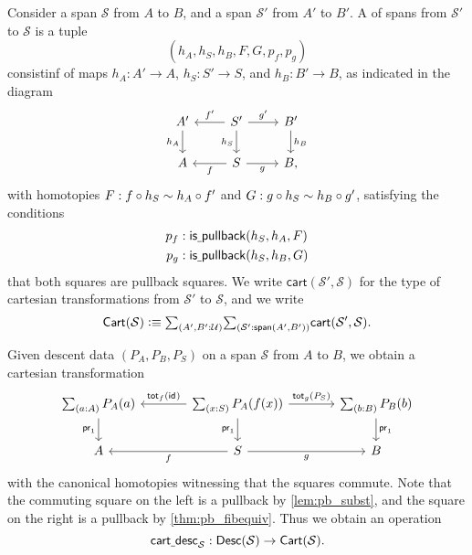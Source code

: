 \begin{defn}
Consider a span $\mathcal{S}$ from $A$ to $B$, and a span $\mathcal{S}'$ from $A'$ to $B'$. A  of spans from $\mathcal{S}'$ to $\mathcal{S}$ is a tuple
\begin{equation*}
(h_A,h_S,h_B,F,G,p_f,p_g)
\end{equation*}
consistinf of maps $h_A:A'\to A$, $h_S:S'\to S$, and $h_B:B'\to B$, as indicated in the diagram
\begin{equation*}
\begin{tikzcd}
A' \arrow[d,swap,"h_A"]  & S' \arrow[l,swap,"{f'}"] \arrow[r,"{g'}"] \arrow[d,swap,"h_S"] & B' \arrow[d,"h_B"] \\
A & S \arrow[l,"f"] \arrow[r,swap,"g"] & B,
\end{tikzcd}
\end{equation*}
with homotopies $F:f\circ h_S\sim h_A\circ f'$ and $G:g\circ h_S\sim h_B\circ g'$, satisfying the conditions
\begin{align*}
p_f & : \mathsf{is\underline{\ }{}pullback}(h_S,h_A,F) \\
p_g & : \mathsf{is\underline{\ }{}pullback}(h_S,h_B,G)
\end{align*}
that both squares are pullback squares. We write $\mathsf{cart}(\mathcal{S}',\mathcal{S})$ for the type of cartesian transformations from $\mathcal{S}'$ to $\mathcal{S}$, and we write
\begin{equation*}
\mathsf{Cart}(\mathcal{S}) \defeq \sm{A',B':\UU}{\mathcal{S}':\mathsf{span}(A',B')}\mathsf{cart}(\mathcal{S}',\mathcal{S}).
\end{equation*}
\end{defn}

Given descent data $(P_A,P_B,P_S)$ on a span $\mathcal{S}$ from $A$ to $B$, we obtain a cartesian transformation
\begin{equation*}
\begin{tikzcd}[column sep=large]
\sm{a:A}P_A(a) \arrow[d,swap,"\proj 1"] & \sm{x:S}P_A(f(x)) \arrow[d,swap,"\proj 1"] \arrow[l,swap,"{\total[f]{\idfunc}}"] \arrow[r,"{\total[g]{P_S}}"] & \sm{b:B}P_B(b) \arrow[d,"\proj 1"] \\
A & S \arrow[l,"f"] \arrow[r,swap,"g"] & B
\end{tikzcd}
\end{equation*}
with the canonical homotopies witnessing that the squares commute. Note that the commuting square on the left is a pullback by \cref{lem:pb_subst}, and the square on the right is a pullback by \cref{thm:pb_fibequiv}. Thus we obtain an operation
\begin{equation*}
\mathsf{cart\underline{\ }{}desc}_{\mathcal{S}}:\mathsf{Desc}(\mathcal{S})\to \mathsf{Cart}(\mathcal{S}).
\end{equation*}

